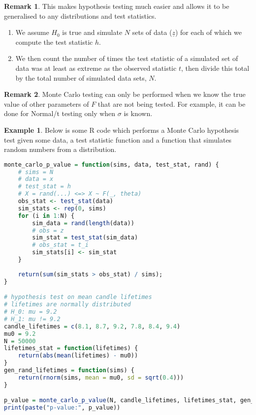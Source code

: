 \documentclass[12pt,a4paper]{article}
\theoremstyle{definition}
\newtheorem{example}[definition]{Example}
\newtheorem*{remark}{Remark}
\begin{document}
\begin{remark}
	This makes hypothesis testing much easier and allows it to be generalised to any distributions and test statistics.

	\begin{enumerate}
		\item We assume $H_0$ is true and simulate $N$ sets of data ($\underline{z}$) for each of which we compute the test statistic $h$.
		\item We then count the number of times the test statistic of a simulated set of data was at least as extreme as the observed statistic $t$, then divide this total by the total number of simulated data sets, $N$.
	\end{enumerate}
\end{remark}

\begin{remark}
	Monte Carlo testing can only be performed when we know the true value of other parameters of $F$ that are not being tested. For example, it can be done for Normal/t testing only when $\sigma$ is known.
\end{remark}

\begin{example}
	Below is some R code which performs a Monte Carlo hypothesis test given some data, a test statistic function and a function that simulates random numbers from a distribution.

	\begin{lstlisting}[language=R]
monte_carlo_p_value = function(sims, data, test_stat, rand) {
	# sims = N
	# data = x
	# test_stat = h
	# X = rand(...) <=> X ~ F(_, theta)
	obs_stat <- test_stat(data)
	sim_stats <- rep(0, sims)
	for (i in 1:N) {
		sim_data = rand(length(data))
		# obs = z
		sim_stat = test_stat(sim_data)
		# obs_stat = t_i
		sim_stats[i] <- sim_stat
	}
	
	return(sum(sim_stats > obs_stat) / sims);
}

# hypothesis test on mean candle lifetimes
# lifetimes are normally distributed
# H_0: mu = 9.2
# H_1: mu != 9.2
candle_lifetimes = c(8.1, 8.7, 9.2, 7.8, 8.4, 9.4)
mu0 = 9.2
N = 50000
lifetimes_stat = function(lifetimes) {
	return(abs(mean(lifetimes) - mu0))
}
gen_rand_lifetimes = function(sims) {
	return(rnorm(sims, mean = mu0, sd = sqrt(0.4)))
}

p_value = monte_carlo_p_value(N, candle_lifetimes, lifetimes_stat, gen_rand_lifetimes)
print(paste("p-value:", p_value))
	\end{lstlisting}
\end{example}
\end{document}
